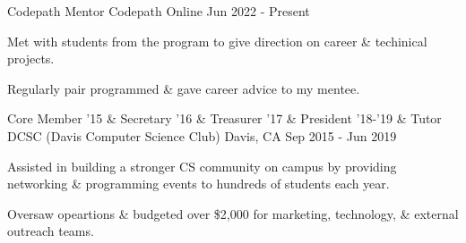 

\begin{cventries}

  \cventry
  {Codepath Mentor} %
  {Codepath} %
  {Online} %
  {Jun 2022  - Present} %
  {
    \begin{cvitems} %
      \item {Met with students from the program to give direction on career \& techinical projects.}
      \item {Regularly pair programmed \& gave career advice to my mentee.}
    \end{cvitems}
  }

  \cventry
  {Core Member '15 \& Secretary '16 \& Treasurer '17 \& President '18-'19 \& Tutor} %
  {DCSC (Davis Computer Science Club)} %
  {Davis, CA} %
  {Sep 2015 - Jun 2019} %
  {
    \begin{cvitems} %
      \item {Assisted in building a stronger CS community on campus by providing networking \& programming events to hundreds of students each year.}
      \item {Oversaw opeartions \& budgeted over \$2,000 for marketing, technology, \& external outreach teams.}
    \end{cvitems}
  }

\end{cventries}
